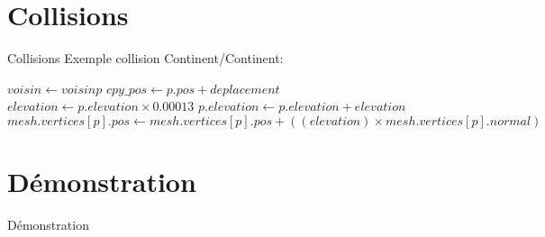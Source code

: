 \documentclass{beamer}
\begin{document}
\section{Collisions}
\begin{frame}{Collisions}
Exemple collision Continent/Continent:
\begin{scriptsize}
\begin{algorithm}[H]
{
        {
                {
                        $voisin \gets voisin p$\;
                        $cpy\_pos\gets p.pos + deplacement$\;
                        {
                                $elevation \gets p.elevation \times 0.00013$
                                $p.elevation \gets p.elevation + elevation$\;
                                $mesh.vertices[p].pos \gets mesh.vertices[p].pos + ((elevation) \times mesh.vertices[p].normal)$\;
                        }
                }
        }
}
\end{algorithm}
\end{scriptsize}

\end{frame}



\section{Démonstration}
\begin{frame}{Démonstration}

\end{frame}
\end{document}
